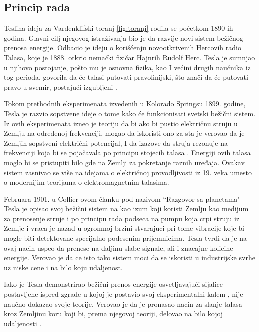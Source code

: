 \documentclass[a4paper]{article}
\begin{document}
\subsection{Princip rada}
\label{subsec:principrada}
Teslina ideja za Vardenklifski toranj \ref{fig:toranj} rodila se početkom 1890-ih godina. Glavni cilj njegovog istraživanja bio je da razvije novi sistem bežičnog prenosa energije. Odbacio je ideju o korišćenju novootkrivenih Hercovih radio Talasa, koje je 1888. otkrio nemački fizičar Hajnrih Rudolf Herc. Tesla je sumnjao u njihovo postojanje, pošto mu je osnovna fizika, kao I većini drugih naučnika iz tog perioda, govorila da će talasi  putovati pravolinijski, što znači da će putovati pravo u svemir, postajući izgubljeni \cite{izgubljeniTalasi}.

Tokom prethodnih eksperimenata izvedenih u Kolorado Springsu 1899. godine, Tesla je razvio sopstvene ideje o tome kako će funkcionisati svetski bežični sistem. Iz ovih eksperimenata izneo je teoriju da bi ako bi pustio električnu struju u Zemlju na određenoj frekvenciji, mogao da iskoristi ono za sta je verovao da je Zemljin sopstveni električni potencijal, I da izazove da struja rezonuje na frekvenciji koja bi se pojačavala po principu stojecih talasa \cite{stojeciTalasi}. Energiji ovih talasa moglo bi se pristupiti bilo gde na Zemlji za pokretanje raznih uređaja. Ovakav sistem zasnivao se više na idejama o električnoj provodljivosti iz 19. veka umesto o modernijim teorijama o elektromagnetnim talasima.
	
Februara 1901. u Collier-ovom članku pod nazivom “Razgovor sa planetama" \cite{razgovorsaplanetama} Tesla je opisao svoj bežični sistem na kao izum koji koristi Zemlju kao medijum za prenosenje struje i po principu rada podseca na pumpu koja crpi struju iz Zemlje i vraca je nazad u ogromnoj brzini stvarajuci pri tome vibracije koje bi mogle biti detektovane specijalno podesenim prijemnicima. Tesla tvrdi da je na ovaj nacin uspeo da prenese na daljinu slabe signale, ali i znacajne kolicine energije. Verovao je da ce isto tako sistem moci da se iskoristi u industrijske svrhe uz niske cene i na bilo koju udaljenost. 

Iako je Tesla demonstrirao bežični prenos energije osvetljavajući sijalice postavljene ispred zgrade u kojoj je postavio svoj eksperimentalni kalem \cite{teslinClanak}, nije naučno dokazao svoje teorije. Verovao je da je pronasao nacin za slanje talasa kroz Zemljinu koru koji bi, prema njegovoj teoriji, delovao na bilo kojoj udaljenosti \cite{teorija}.
\end{document}

